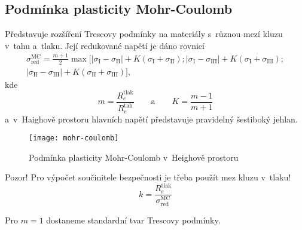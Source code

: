 
\subsection{Podmínka plasticity Mohr-Coulomb}\label{sec:mohr-coulomb}
Představuje rozšíření Trescovy podmínky na materiály s~různou mezí kluzu v~tahu a~tlaku.
Její redukované napětí je dáno rovnicí
\begin{multline}
	\sigma_\text{red}^\text{MC}
	= \frac{m+1}{2} \max\Big[
	\left|\sigma_\text{I} - \sigma_\text{II}\right| + K \left(\sigma_\text{I} + \sigma_\text{II}\right);
	\left|\sigma_\text{I} - \sigma_\text{III}\right| + K \left(\sigma_\text{I} + \sigma_\text{III}\right);\\
	\left|\sigma_\text{II} - \sigma_\text{III}\right| + K \left(\sigma_\text{II} + \sigma_\text{III}\right)
	\Big],
\end{multline}
kde
\begin{equation*}
	m = \frac{R_e^\text{tlak}}{R_e^\text{tah}}
	\qquad\text{a}\qquad
	K = \frac{m-1}{m+1}
\end{equation*}
a~v~Haighově prostoru hlavních napětí představuje pravidelný šestiboký jehlan.
\begin{figure}[H]
	\centering
	\texttt{[image: mohr-coulomb]}
	\caption{Podmínka plasticity Mohr-Coulomb v~Heighově prostoru}
	\label{fig:mohr-coulomb}
\end{figure}

Pozor! Pro výpočet součinitele bezpečnosti je třeba použít mez kluzu v~tlaku!
\begin{equation}
	k = \frac{R_e^\text{tlak}}{\sigma_\text{red}^\text{MC}}
\end{equation}

Pro $m=1$ dostaneme standardní tvar Trescovy podmínky.
